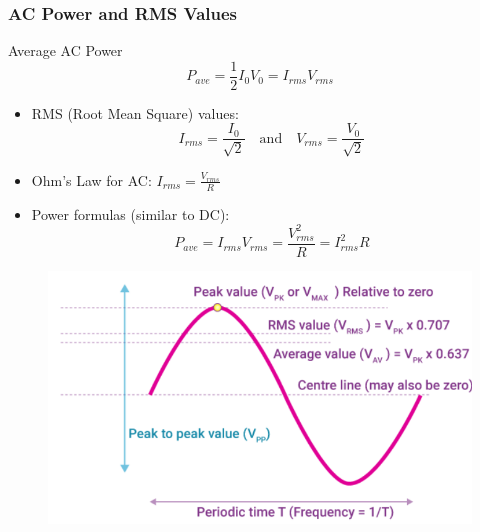 \documentclass{beamer}
\begin{document}
\begin{frame}
    \frametitle{AC Power and RMS Values}
    \begin{block}{Average AC Power}
        \[ P_{ave} = \frac{1}{2}I_0V_0 = I_{rms}V_{rms} \]
    \end{block}
    \begin{itemize}
        \item RMS (Root Mean Square) values:
        \[ I_{rms} = \frac{I_0}{\sqrt{2}} \quad \text{and} \quad V_{rms} = \frac{V_0}{\sqrt{2}} \]
        \item Ohm's Law for AC: $I_{rms} = \frac{V_{rms}}{R}$
        \item Power formulas (similar to DC):
        \[ P_{ave} = I_{rms}V_{rms} = \frac{V_{rms}^2}{R} = I_{rms}^2R \]
    \end{itemize}
  \end{frame}

\begin{frame}
\begin{figure}
      \centering
      \includegraphics[width=0.75\linewidth]{phys12-circuits-rms-voltage-ac.png}
  \end{figure}
\end{frame}
\end{document}
